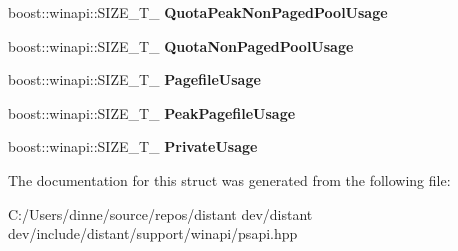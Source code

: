 \begin{DoxyCompactItemize}
boost\+::winapi\+::\+S\+I\+Z\+E\+\_\+\+T\+\_\+ {\bfseries Quota\+Peak\+Non\+Paged\+Pool\+Usage}
\item 
\mbox{\label{structboost_1_1winapi_1_1___p_r_o_c_e_s_s___m_e_m_o_r_y___c_o_u_n_t_e_r_s___e_x___abb61e21f6b370ae840c7253e5835436b}} 
boost\+::winapi\+::\+S\+I\+Z\+E\+\_\+\+T\+\_\+ {\bfseries Quota\+Non\+Paged\+Pool\+Usage}
\item 
\mbox{\label{structboost_1_1winapi_1_1___p_r_o_c_e_s_s___m_e_m_o_r_y___c_o_u_n_t_e_r_s___e_x___ad7f7f71be7b61c3c4cde470461dbeb96}} 
boost\+::winapi\+::\+S\+I\+Z\+E\+\_\+\+T\+\_\+ {\bfseries Pagefile\+Usage}
\item 
\mbox{\label{structboost_1_1winapi_1_1___p_r_o_c_e_s_s___m_e_m_o_r_y___c_o_u_n_t_e_r_s___e_x___a9d38c94ea8f4cc8591d872a5ea75a870}} 
boost\+::winapi\+::\+S\+I\+Z\+E\+\_\+\+T\+\_\+ {\bfseries Peak\+Pagefile\+Usage}
\item 
\mbox{\label{structboost_1_1winapi_1_1___p_r_o_c_e_s_s___m_e_m_o_r_y___c_o_u_n_t_e_r_s___e_x___a62b4b098a959d766c70206f3f8ef47e4}} 
boost\+::winapi\+::\+S\+I\+Z\+E\+\_\+\+T\+\_\+ {\bfseries Private\+Usage}
\end{DoxyCompactItemize}


The documentation for this struct was generated from the following file\+:\begin{DoxyCompactItemize}
\item 
C\+:/\+Users/dinne/source/repos/distant dev/distant dev/include/distant/support/winapi/psapi.\+hpp\end{DoxyCompactItemize}
